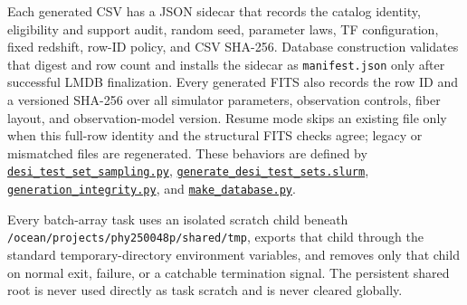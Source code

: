 \documentclass[11pt]{article}
\newcommand{\code}[1]{\nolinkurl{#1}}
\begin{document}
Each generated CSV has a JSON sidecar that records the catalog identity,
eligibility and support audit, random seed, parameter laws, TF configuration,
fixed redshift, row-ID policy, and CSV SHA-256. Database construction validates
that digest and row count and installs the sidecar as \code{manifest.json} only
after successful LMDB finalization. Every generated FITS also records the row
ID and a versioned SHA-256 over all simulator parameters, observation controls,
fiber layout, and observation-model version. Resume mode skips an existing
file only when this full-row identity and the structural FITS checks agree;
legacy or mismatched files are regenerated. These behaviors are defined by
\href{../data_generate/desi_test_set_sampling.py}{\code{desi_test_set_sampling.py}},
\href{../data_generate/generate_desi_test_sets.slurm}{\code{generate_desi_test_sets.slurm}},
\href{../data_generate/generation_integrity.py}{\code{generation_integrity.py}}, and
\href{../data_generate/make_database.py}{\code{make_database.py}}.

Every batch-array task uses an isolated scratch child beneath
\code{/ocean/projects/phy250048p/shared/tmp}, exports that child through the standard
temporary-directory environment variables, and removes only that child on
normal exit, failure, or a catchable termination signal. The persistent shared
root is never used directly as task scratch and is never cleared globally.
\end{document}

